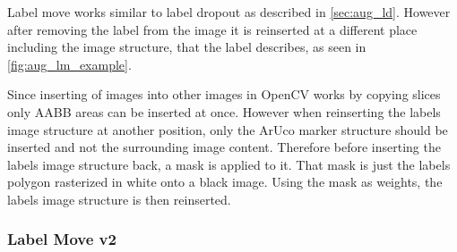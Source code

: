 \documentclass[10pt]{book}
\begin{document}
Label move works similar to label dropout as described in \autoref{sec:aug_ld}. However after removing the label from the image it is reinserted at a different place including the image structure, that the label describes, as seen in \autoref{fig:aug_lm_example}. 

Since inserting of images into other images in OpenCV works by copying slices only \ac{AABB} areas can be inserted at once. However when reinserting the labels image structure at another position, only the \ac{ArUco} marker structure should be inserted and not the surrounding image content. Therefore before inserting the labels image structure back, a mask is applied to it. That mask is just the labels polygon rasterized in white onto a black image. Using the mask as weights, the labels image structure is then reinserted.

\subsubsection{Label Move v2}
\end{document}
